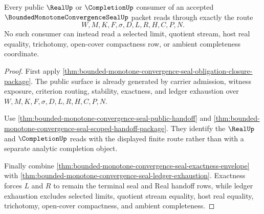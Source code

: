 \begin{theorem}
\label{thm:bounded-monotone-convergence-seal-public-route-totality}
Every public $\RealUp$ or $\CompletionUp$ consumer of an accepted $\BoundedMonotoneConvergenceSealUp$ packet reads through exactly the route
$$
W,M,K,F,\sigma,D,L,R,H,C,P,N.
$$
No such consumer can instead read a selected limit, quotient stream, host real equality, trichotomy, open-cover compactness row, or ambient completeness coordinate.
\end{theorem}
\begin{proof}
First apply \autoref{thm:bounded-monotone-convergence-seal-obligation-closure-package}. The public surface is already generated by carrier admission, witness exposure, criterion routing, stability, exactness, and ledger exhaustion over $W,M,K,F,\sigma,D,L,R,H,C,P,N$.

Use \autoref{thm:bounded-monotone-convergence-seal-public-handoff} and \autoref{thm:bounded-monotone-convergence-seal-scoped-handoff-package}. They identify the $\RealUp$ and $\CompletionUp$ reads with the displayed finite route rather than with a separate analytic completion object.

Finally combine \autoref{thm:bounded-monotone-convergence-seal-exactness-envelope} with \autoref{thm:bounded-monotone-convergence-seal-ledger-exhaustion}. Exactness forces $L$ and $R$ to remain the terminal seal and Real handoff rows, while ledger exhaustion excludes selected limits, quotient stream equality, host real equality, trichotomy, open-cover compactness, and ambient completeness.
\end{proof}

